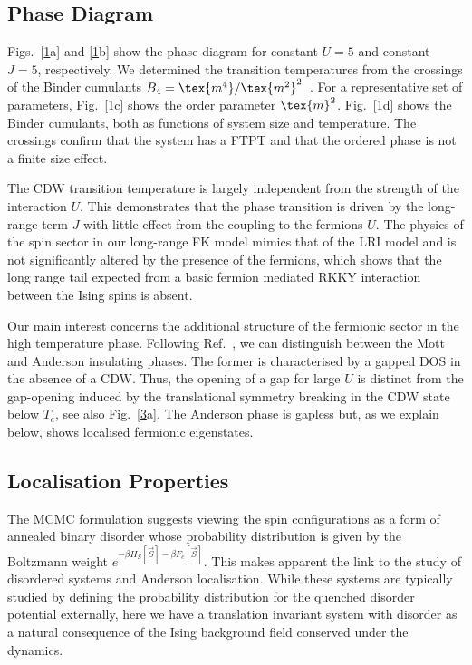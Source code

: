 \hypertarget{phase-diagram}{%
\subsection{Phase Diagram}\label{phase-diagram}}

Figs.~{[}\protect\hyperlink{fig:phase_diagram}{1}a{]} and {[}\protect\hyperlink{fig:phase_diagram}{1}b{]} show the phase diagram for constant \(U=5\) and constant \(J=5\), respectively. We determined the transition temperatures from the crossings of the Binder cumulants \(B_4 = \tex{m^4}/\tex{m^2}^2\)~\autocite{binderFiniteSizeScaling1981}. For a representative set of parameters, Fig.~{[}\protect\hyperlink{fig:phase_diagram}{1}c{]} shows the order parameter \(\tex{m}^2\). Fig.~{[}\protect\hyperlink{fig:phase_diagram}{1}d{]} shows the Binder cumulants, both as functions of system size and temperature. The crossings confirm that the system has a FTPT and that the ordered phase is not a finite size effect.

The CDW transition temperature is largely independent from the strength of the interaction \(U\). This demonstrates that the phase transition is driven by the long-range term \(J\) with little effect from the coupling to the fermions \(U\). The physics of the spin sector in our long-range FK model mimics that of the LRI model and is not significantly altered by the presence of the fermions, which shows that the long range tail expected from a basic fermion mediated RKKY interaction between the Ising spins is absent.

Our main interest concerns the additional structure of the fermionic sector in the high temperature phase. Following Ref.~\autocite{antipovInteractionTunedAndersonMott2016}, we can distinguish between the Mott and Anderson insulating phases. The former is characterised by a gapped DOS in the absence of a CDW. Thus, the opening of a gap for large \(U\) is distinct from the gap-opening induced by the translational symmetry breaking in the CDW state below \(T_c\), see also Fig.~{[}\protect\hyperlink{fig:band_opening}{3}a{]}. The Anderson phase is gapless but, as we explain below, shows localised fermionic eigenstates.

\hypertarget{localisation-properties}{%
\subsection{Localisation Properties}\label{localisation-properties}}

The MCMC formulation suggests viewing the spin configurations as a form of annealed binary disorder whose probability distribution is given by the Boltzmann weight \(e^{-\beta H_S[\vec{S}] - \beta F_c[\vec{S}]}\). This makes apparent the link to the study of disordered systems and Anderson localisation. While these systems are typically studied by defining the probability distribution for the quenched disorder potential externally, here we have a translation invariant system with disorder as a natural consequence of the Ising background field conserved under the dynamics.

